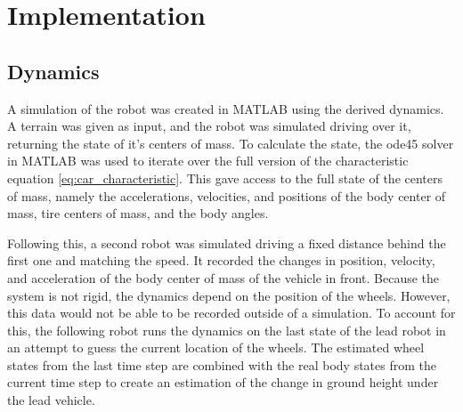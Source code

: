 \chapter{Implementation}

\section{Dynamics}
A simulation of the robot was created in MATLAB using the derived dynamics. A terrain was given as input, and the robot was simulated driving over it, returning the state of it's centers of mass. To calculate the state, the ode45 solver in MATLAB was used to iterate over the full version of the characteristic equation \eqref{eq:car_characteristic}. This gave access to the full state of the centers of mass, namely the accelerations, velocities, and positions of the body center of mass, tire centers of mass, and the body angles.

Following this, a second robot was simulated driving a fixed distance behind the first one and matching the speed. It recorded the changes in position, velocity, and acceleration of the body center of mass of the vehicle in front. Because the system is not rigid, the dynamics depend on the position of the wheels. However, this data would not be able to be recorded outside of a simulation. To account for this, the following robot runs the dynamics on the last state of the lead robot in an attempt to guess the current location of the wheels. The estimated wheel states from the last time step are combined with the real body states from the current time step to create an estimation of the change in ground height under the lead vehicle.

